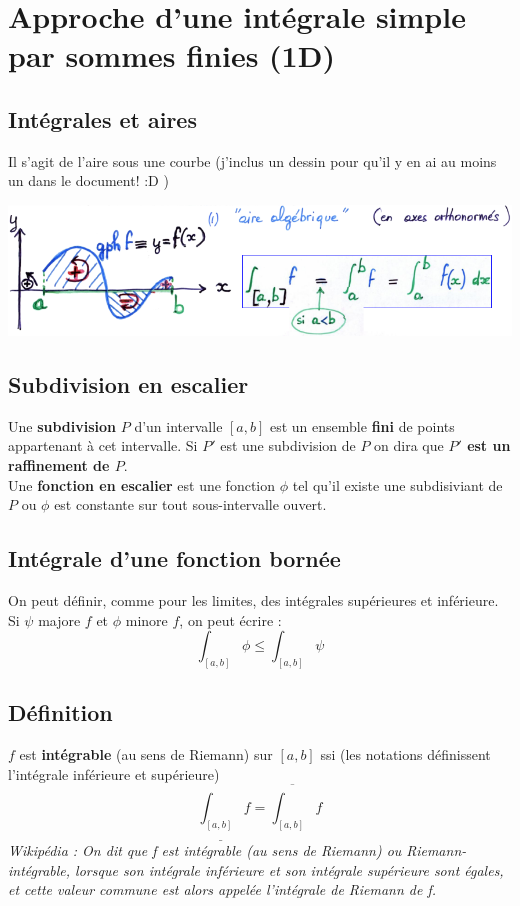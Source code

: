 \documentclass	[11pt, a4paper, openany]{book}
\begin{document}
\section{Approche d'une intégrale simple par sommes finies (1D)}
\subsection{Intégrales et aires}
Il s'agit de l'aire sous une courbe (j'inclus un dessin pour qu'il y en ai au moins un dans le document! :D  )
\begin{center}
\includegraphics[scale=0.55]{image1.png}
\end{center}
\subsection{Subdivision en escalier}
Une \textbf{subdivision} $P$ d'un intervalle $[a, b]$ est un ensemble \textbf{fini} de points appartenant à cet intervalle. Si $P'$ est une subdivision de $P$ on dira que \textbf{$P'$ est un raffinement de $P$}.\\

Une \textbf{fonction en escalier} est une fonction $\phi$ tel qu'il existe une subdisiviant de $P$ ou $\phi$ est constante sur tout sous-intervalle ouvert.

\subsection{Intégrale d'une fonction bornée}
On peut définir, comme pour les limites, des intégrales supérieures et inférieure. Si $\psi$ majore $f$ et $\phi$ minore $f$, on peut écrire :
$$\int_{[a,b]} \phi \leq \int_{[a,b]} \psi$$

\subsection*{Définition}
$f$ est \textbf{intégrable} (au sens de Riemann) sur $[a, b]$ ssi  (les notations définissent l'intégrale inférieure et supérieure)
$$\underline{\int_{[a,b]}} f = \overline{\int_{[a,b]}} f$$
\textit{Wikipédia : On dit que f est intégrable (au sens de Riemann) ou Riemann-intégrable, lorsque son intégrale inférieure et son intégrale supérieure sont égales, et cette valeur commune est alors appelée l'intégrale de Riemann de f.}\\
\end{document}
